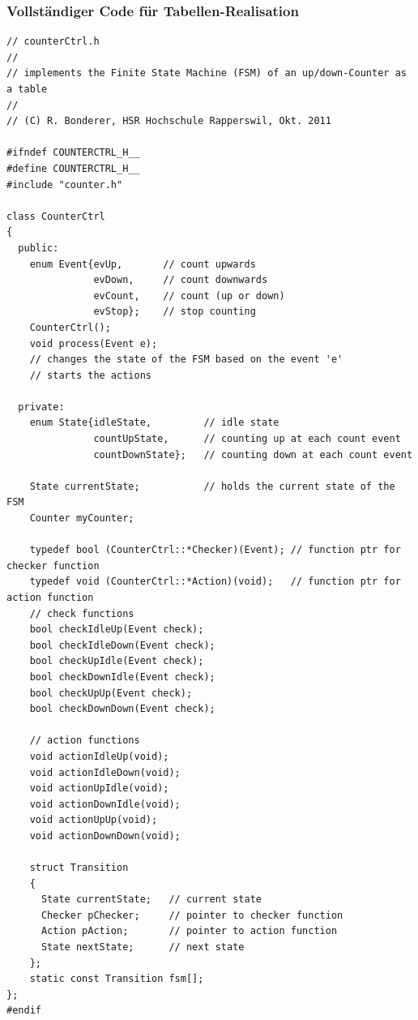 \subsubsection{Vollständiger Code für Tabellen-Realisation}
\begin{lstlisting}[style=Cpp]
// counterCtrl.h
//
// implements the Finite State Machine (FSM) of an up/down-Counter as a table
//
// (C) R. Bonderer, HSR Hochschule Rapperswil, Okt. 2011

#ifndef COUNTERCTRL_H__
#define COUNTERCTRL_H__
#include "counter.h"

class CounterCtrl
{
  public:
    enum Event{evUp,       // count upwards
               evDown,     // count downwards
               evCount,    // count (up or down)
               evStop};    // stop counting
    CounterCtrl();
    void process(Event e);
    // changes the state of the FSM based on the event 'e'
    // starts the actions

  private:
    enum State{idleState,         // idle state
               countUpState,      // counting up at each count event
               countDownState};   // counting down at each count event

    State currentState;           // holds the current state of the FSM
    Counter myCounter;
    
    typedef bool (CounterCtrl::*Checker)(Event); // function ptr for checker function
    typedef void (CounterCtrl::*Action)(void);   // function ptr for action function
    // check functions
    bool checkIdleUp(Event check);
    bool checkIdleDown(Event check);
    bool checkUpIdle(Event check);
    bool checkDownIdle(Event check);
    bool checkUpUp(Event check);
    bool checkDownDown(Event check);
    
    // action functions
    void actionIdleUp(void);
    void actionIdleDown(void);
    void actionUpIdle(void);
    void actionDownIdle(void);
    void actionUpUp(void);
    void actionDownDown(void);
    
    struct Transition
    {
      State currentState;   // current state
      Checker pChecker;     // pointer to checker function
      Action pAction;       // pointer to action function
      State nextState;      // next state
    };
    static const Transition fsm[];
};
#endif
\end{lstlisting}

